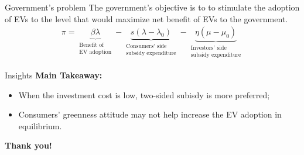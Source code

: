 \documentclass{beamer}%
\begin{document}
\begin{frame}{Government's problem }
	The government's objective  is to to stimulate the adoption of EVs to the level that would maximize net benefit of EVs to the government.
	\begin{align*}
		\pi = \underbrace{\beta \lambda }_{\substack{\text{Benefit of} \\ \text{EV adoption}}}
		- \underbrace{s(\lambda - \lambda_0)}_{\substack{\text{Consumers' side} \\ \text{subsidy expenditure}}}
		- \underbrace{\eta(\mu - \mu_0)}_{\substack{\text{Investors' side} \\ \text{subsidy expenditure}}}
	\end{align*}
\end{frame}


\begin{frame}{Insights}
	\textbf{Main Takeaway: }\\
	\begin{itemize}
		\item When the investment cost is low, two-sided subisdy is more preferred; 
		\item Consumers' greenness attitude may not help increase the EV adoption in equilibrium.
	\end{itemize}

	\bigskip

	\centering
	\Huge \textbf{Thank you!}
\end{frame}
\end{document}
